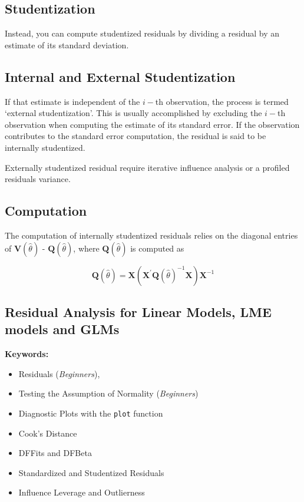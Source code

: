 \documentclass[Main.tex]{subfiles}
\begin{document}
\subsection{Studentization} %
Instead, you can compute studentized residuals by dividing a residual by an estimate of its standard deviation. 

\subsection{Internal and External Studentization} %
If that estimate is independent of the $i-$th observation, the process is termed `external studentization'. This is usually accomplished by excluding the $i-$th observation when computing the estimate of its standard error. If the observation contributes to the
standard error computation, the residual is said to be internally studentized.

Externally  studentized residual require iterative influence analysis or a profiled residuals variance.


\subsection{Computation}%

The computation of internally studentized residuals relies on the diagonal entries of $\boldsymbol{V} (\hat{\theta})$ - $\boldsymbol{Q} (\hat{\theta})$, where $\boldsymbol{Q} (\hat{\theta})$ is computed as

\[ \boldsymbol{Q} (\hat{\theta}) = \boldsymbol{X} ( \boldsymbol{X}^{\prime}\boldsymbol{Q} (\hat{\theta})^{-1}\boldsymbol{X})\boldsymbol{X}^{-1} \]


\subsection{Residual Analysis for Linear Models, LME models and GLMs}

\textbf{Keywords:}

\begin{itemize}
	\item Residuals (\emph{Beginners}), 
	\item Testing the Assumption of Normality (\emph{Beginners})
	\item Diagnostic Plots with the \texttt{plot} function
	\item Cook's Distance
	\item DFFits and DFBeta
	\item Standardized and Studentized Residuals
	\item Influence Leverage and Outlierness
\end{itemize}
\end{document}
